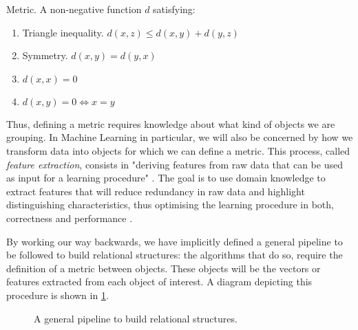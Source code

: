 \documentclass[../main.tex]{subfiles}
\begin{document}
\theoremstyle{definition}
\begin{definition}{Metric}.
\label{def_metric}
A non-negative function $d$ satisfying:
\begin{enumerate}
\item Triangle inequality. $d(x, z) \leq d(x, y) + d(y, z) $
\item Symmetry. $d(x, y) = d(y, x)$
\item $d(x, x) = 0$
\item $d(x, y) = 0 \iff x = y$
\end{enumerate}
\end{definition}
\par Thus, defining a metric requires knowledge about what kind of objects we are grouping. In Machine Learning in particular, we will also be concerned by how we transform data into objects for which we can define a metric. This process, called \emph{feature extraction}, consists in "deriving features from raw data that can be used as input for a learning procedure" \cite{hastie2008}. The goal is to use domain knowledge to extract features that will reduce redundancy in raw data and highlight distinguishing characteristics, thus optimising the learning procedure in both, correctness and performance \cite{Bishop2006}. 
\par By working our way backwards, we have implicitly defined a general pipeline to be followed to build relational structures: the algorithms that do so, require the definition of a metric between objects. These objects will be the vectors or features extracted from each object of interest. A diagram depicting this procedure is shown in \ref{pipeline}.
\begin{figure}
\centering
{}
\caption{A general pipeline to build relational structures.}
\label{pipeline}
\end{figure}
\end{document}
